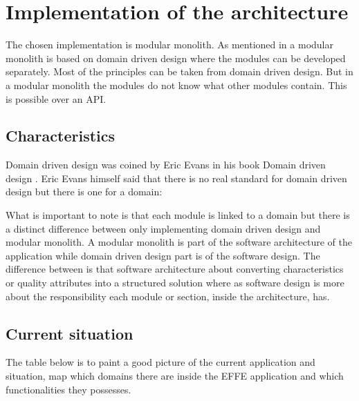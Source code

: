 \chapter{Implementation of the architecture}

The chosen implementation is modular monolith. As mentioned in  a modular monolith is based on domain driven design where the modules can be developed separately. Most of the principles can be taken from domain driven design. But in a modular monolith the modules do not know what other modules contain. This is possible over an API.

\section{Characteristics}

Domain driven design was coined by Eric Evans in his book Domain driven design \cite{domainDrivenDesign}. Eric Evans himself said that there is no real standard for domain driven design but there is one for a domain:


What is important to note is that each module is linked to a domain but there is a distinct difference between only implementing domain driven design and modular monolith. A modular monolith is part of the software architecture of the application while domain driven design part is of the software design. The difference between is that software architecture about converting characteristics or quality attributes into a structured solution where as software design is more about the responsibility each module or section, inside the architecture, has. \cite{softwareArchitectureDefinition}

\section{Current situation}

The table below is to paint a good picture of the current application and situation, map which domains there are inside the EFFE application and which functionalities they possesses.

